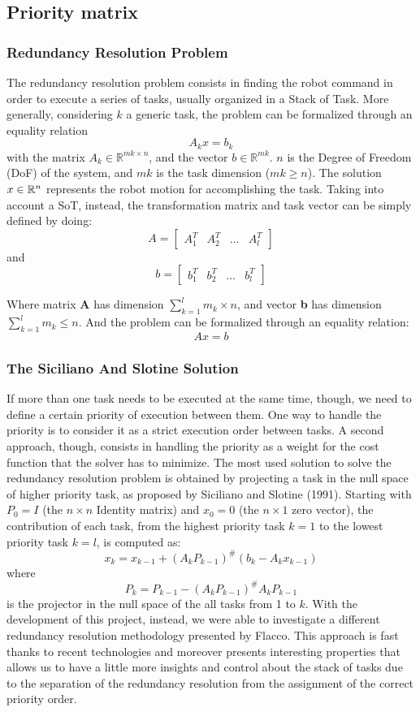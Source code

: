 \documentclass[11pt,a4paper, twocolumn, twoside]{article}
\newcommand{\R}{\mathbb{R}}
\begin{document}
\subsection{Priority matrix}
\subsubsection{Redundancy Resolution Problem}
The redundancy resolution problem consists in finding the robot command in order to execute a series of tasks, usually organized in a Stack of Task.
More generally, considering $k$ a generic task, the problem can be formalized through an equality relation \[A_kx=b_k\]
with the matrix $A_k \in \R^{mk \times n}$, and the vector $b \in \R^{mk}$. $n$ is the Degree of Freedom (DoF) of the system, and $mk$ is the task dimension ($mk \geq n$). The solution $x \in \Bbb R^n$ represents the robot motion for accomplishing the task.
Taking into account a SoT, instead, the transformation matrix and task vector can be simply defined by doing:
\[A=\begin{bmatrix}
A_1^T & A_2^T & \dots & A_l^T
\end{bmatrix}
\]
and
\[b=\begin{bmatrix}
b_1^T & b_2^T & \dots & b_l^T
\end{bmatrix}
\]

Where matrix \textbf{A} has dimension $\sum_{k=1}^l m_k \times n$, and vector \textbf{b} has dimension $\sum_{k=1}^l m_k \leq n$.
And the problem can be formalized through an equality relation: \[Ax = b\]

\subsubsection{The Siciliano And Slotine Solution}

If more than one task needs to be executed at the same time, though, we need to define a certain priority of execution between them. One way to handle the priority is  to consider it as a strict execution order between tasks. A second approach, though, consists in handling the priority as a weight for the cost function that the solver has to minimize.
The most used solution to solve the redundancy resolution problem is obtained by projecting a task in the null space of higher priority task, as proposed by Siciliano and Slotine (1991). Starting with $P_0 = I$ (the $n \times n$ Identity matrix) and $x_0 = 0$ (the $n \times 1$ zero vector), the contribution of each task, from the highest priority task $k = 1$ to the lowest priority task $k = l$, is computed as:
\[
x_k = x_{k-1} + (A_kP_{k-1})^{\#}(b_k - A_kx_{k-1})
\]where \[
P_k = P_{k-1}-(A_kP_{k-1})^{\#}A_kP_{k-1}
\]
is the projector in the null space of the all tasks from 1 to $k$.
With the development of this project, instead, we were able to investigate a different redundancy resolution methodology presented by Flacco. This approach is fast thanks to recent technologies and moreover presents interesting properties that allows us to have a little more insights and control about the stack of tasks due to the separation of the redundancy resolution from the assignment of the correct priority order. 
\end{document}
